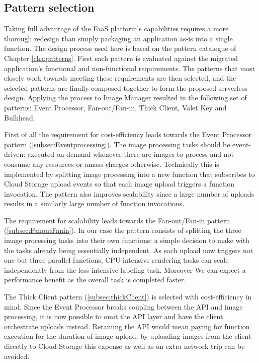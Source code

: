\subsection{Pattern selection}

Taking full advantage of the FaaS platform's capabilities requires a more thorough redesign than simply packaging an application as-is into a single function. The design process used here is based on the pattern catalogue of Chapter \ref{cha:patterns}. First each pattern is evaluated against the migrated application's functional and non-functional requirements. The patterns that most closely work towards meeting these requirements are then selected, and the selected patterns are finally composed together to form the proposed serverless design. Applying the process to Image Manager resulted in the following set of patterns: Event Processor, Fan-out/Fan-in, Thick Client, Valet Key and Bulkhead.

First of all the requirement for cost-efficiency leads towards the Event Processor pattern (\ref{subsec:Eventprocessing}). The image processing tasks should be event-driven: executed on-demand whenever there are images to process and not consume any resources or amass charges otherwise. Technically this is implemented by splitting image processing into a new function that subscribes to Cloud Storage upload events so that each image upload triggers a function invocation. The pattern also improves scalability since a large number of uploads results in a similarly large number of function invocations.

The requirement for scalability leads towards the Fan-out/Fan-in pattern (\ref{subsec:FanoutFanin}). In our case the pattern consists of splitting the three image processing tasks into their own functions: a simple decision to make with the tasks already being essentially independent. As each upload now triggers not one but three parallel functions, CPU-intensive rendering tasks can scale independently from the less intensive labeling task. Moreover We can expect a performance benefit as the overall task is completed faster.

The Thick Client pattern (\ref{subsec:thickClient}) is selected with cost-efficiency in mind. Since the Event Processor breaks coupling between the API and image processing, it is now possible to omit the API layer and have the client orchestrate uploads instead. Retaining the API would mean paying for function execution for the duration of image upload; by uploading images from the client directly to Cloud Storage this expense as well as an extra network trip can be avoided.

